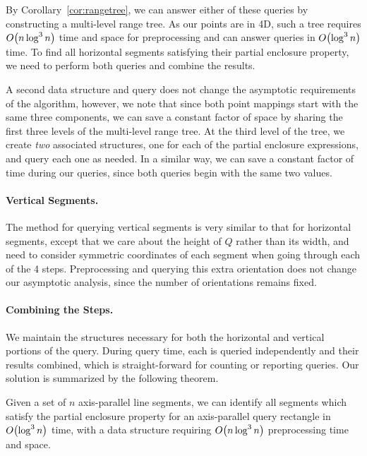 By Corollary~\ref{cor:rangetree}, we can answer either of these queries by constructing a multi-level range tree.
As our points are in 4D, such a tree requires $O\!\left(n \log^3{n}\right)$ time and space for preprocessing and can answer queries in $O\!\left(\log^3{n}\right)$ time.
To find all horizontal segments satisfying their partial enclosure property, we need to perform both queries and combine the results.  

A second data structure and query does not change the asymptotic requirements of the algorithm, however, we note that since both point mappings start with the same three components, we can save a constant factor of space by sharing the first three levels of the multi-level range tree. 
At the third level of the tree, we create \emph{two} associated structures, one for each of the partial enclosure expressions, and query each one as needed. 
In a similar way, we can save a constant factor of time during our queries, since both queries begin with the same two values.


\paragraph{Vertical Segments.} The method for querying vertical segments is very similar to that for horizontal segments, except that we care about the height of $Q$ rather than its width, and need to consider symmetric coordinates of each segment when going through each of the 4 steps.
Preprocessing and querying this extra orientation does not change our asymptotic analysis, since the number of orientations remains fixed.


\paragraph{Combining the Steps.} We maintain the structures necessary for both the horizontal and vertical portions of the query. During query time, each is queried independently and their results combined, which is straight-forward for counting or reporting queries. Our solution is summarized by the following theorem.

\begin{theorem}
\label{th:ap}
Given a set of $n$ axis-parallel line segments, we can identify all segments which satisfy the partial enclosure property for an axis-parallel query rectangle in $O\!\left(\log^3{n}\right)$ time, with a data structure requiring $O\!\left(n\log^3{n}\right)$ preprocessing time and space.
\end{theorem}

